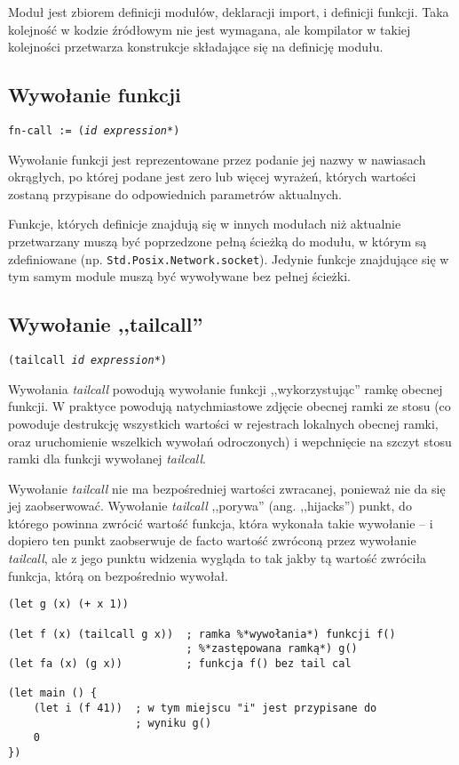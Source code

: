 Moduł jest zbiorem definicji modułów, deklaracji import, i definicji funkcji.
Taka kolejność w kodzie źródłowym nie jest wymagana, ale kompilator w takiej kolejności przetwarza konstrukcje
składające się na definicję modułu.

\subsection{Wywołanie funkcji}
\label{viuact_spec_fn_call}

\texttt{fn-call := (\emph{id} \emph{expression}*)}
\newline

Wywołanie funkcji jest reprezentowane przez podanie jej nazwy w nawiasach
okrągłych, po której podane jest zero lub więcej wyrażeń, których wartości
zostaną przypisane do odpowiednich parametrów aktualnych.

Funkcje, których definicje znajdują się w innych modułach niż aktualnie
przetwarzany muszą być poprzedzone pełną ścieżką do modułu, w którym są
zdefiniowane (np. \texttt{Std.Posix.Network.socket}). Jedynie funkcje znajdujące
się w tym samym module muszą być wywoływane bez pełnej ścieżki.

\subsection{Wywołanie ,,tailcall''}
\label{viuact_spec_tail_call}

\texttt{(tailcall \emph{id} \emph{expression}*)}
\newline

Wywołania \emph{tailcall} powodują wywołanie funkcji ,,wykorzystując'' ramkę
obecnej funkcji. W praktyce powodują natychmiastowe zdjęcie obecnej ramki ze
stosu (co powoduje destrukcję wszystkich wartości w rejestrach lokalnych obecnej
ramki, oraz uruchomienie wszelkich wywołań odroczonych) i wepchnięcie na szczyt
stosu ramki dla funkcji wywołanej \emph{tailcall}.

Wywołanie \emph{tailcall} nie ma bezpośredniej wartości zwracanej, ponieważ nie
da się jej zaobserwować. Wywołanie \emph{tailcall} ,,porywa'' (ang. ,,hijacks'')
punkt, do którego powinna zwrócić wartość funkcja, która wykonała takie
wywołanie -- i dopiero ten punkt zaobserwuje de facto wartość zwróconą przez
wywołanie \emph{tailcall}, ale z jego punktu widzenia wygląda to tak jakby tą
wartość zwróciła funkcja, którą on bezpośrednio wywołał.

\begin{lstlisting}
(let g (x) (+ x 1))

(let f (x) (tailcall g x))  ; ramka %*wywołania*) funkcji f()
                            ; %*zastępowana ramką*) g()
(let fa (x) (g x))          ; funkcja f() bez tail cal

(let main () {
    (let i (f 41))  ; w tym miejscu "i" jest przypisane do
                    ; wyniku g()
    0
})
\end{lstlisting}

